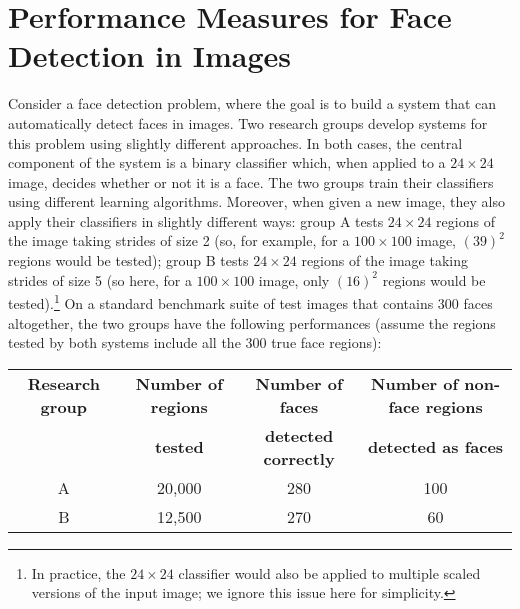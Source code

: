 \section{Performance Measures for Face Detection in Images}
Consider a face detection problem, where the goal is to build a system that can automatically detect faces in images. Two research groups develop systems for this problem using slightly different approaches. In both cases, the central component of the system is a binary classifier which, when applied to a $24 \times 24$ image, decides whether or not it is a face. The two groups train their classifiers using different learning algorithms. Moreover, when given a new image, they also apply their classifiers in slightly different ways: group A tests $24 \times 24$ regions of the image taking strides of size 2 (so, for example, for a $100 \times 100$ image, $(39)^2$ regions would be tested); group B tests $24 \times 24$ regions of the image taking strides of size 5 (so here, for a $100 \times 100$ image, only $(16)^2$ regions would be tested).\footnote{In practice, the $24\times 24$ classifier would also be applied to multiple scaled versions of the input image; we ignore this issue here for simplicity.}
On a standard benchmark suite of test images that contains 300 faces altogether, the two groups have the following performances (assume the regions tested by both systems include all the 300 true face regions):

\begin{center}
\begin{tabular}{|c|c|c|c|}
\hline
\textbf{Research group} & \textbf{Number of regions} & \textbf{Number of faces} & \textbf{Number of non-face regions} \\
	& \textbf{tested} & \textbf{detected correctly} & \textbf{detected as faces} \\
\hline
A & 20,000 & 280 & 100 \\
\hline
B & 12,500 & 270 & 60 \\
\hline
\end{tabular}
\end{center}

